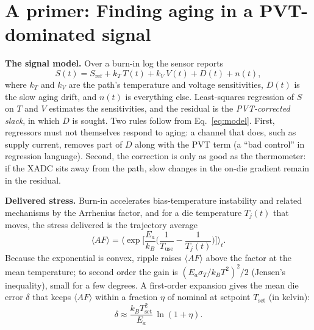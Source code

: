 \documentclass[10pt,twocolumn]{article}
\begin{document}
\section{A primer: Finding aging in a PVT-dominated signal}

\textbf{The signal model.} Over a burn-in log the sensor reports
\begin{equation}
S(t)=S_{\mathrm{ref}}+k_T\,T(t)+k_V\,V(t)+D(t)+n(t),
\label{eq:model}
\end{equation}
where $k_T$ and $k_V$ are the path's temperature and voltage sensitivities, $D(t)$ is the slow aging drift, and $n(t)$ is everything else. Least-squares regression of $S$ on $T$ and $V$ estimates the sensitivities, and the residual is the \emph{PVT-corrected slack}, in which $D$ is sought. Two rules follow from Eq.~\eqref{eq:model}. First, regressors must not themselves respond to aging: a channel that does, such as supply current, removes part of $D$ along with the PVT term (a ``bad control'' in regression language). Second, the correction is only as good as the thermometer: if the XADC sits away from the path, slow changes in the on-die gradient remain in the residual.

\textbf{Delivered stress.} Burn-in accelerates bias-temperature instability and related mechanisms by the Arrhenius factor, and for a die temperature $T_j(t)$ that moves, the stress delivered is the trajectory average
\begin{equation}
\langle AF\rangle=\Big\langle \exp\!\Big[\frac{E_a}{k_B}\Big(\frac{1}{T_{\mathrm{use}}}-\frac{1}{T_j(t)}\Big)\Big]\Big\rangle_t .
\label{eq:af}
\end{equation}
Because the exponential is convex, ripple raises $\langle AF\rangle$ above the factor at the mean temperature; to second order the gain is $(E_a\sigma_T/k_BT^2)^2/2$ (Jensen's inequality), small for a few degrees. A first-order expansion gives the mean die error $\delta$ that keeps $\langle AF\rangle$ within a fraction $\eta$ of nominal at setpoint $T_{\mathrm{set}}$ (in kelvin):
\begin{equation}
\delta\approx\frac{k_B T_{\mathrm{set}}^2}{E_a}\,\ln(1+\eta).
\label{eq:delta}
\end{equation}
\end{document}
